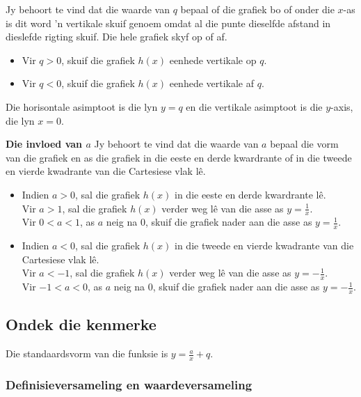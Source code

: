 Jy behoort te vind dat die waarde van $q$ bepaal of die grafiek bo of onder die $x$-as is dit word 'n vertikale skuif genoem omdat al die punte dieselfde afstand in dieslefde rigting skuif. Die hele grafiek skyf op of af.  
\begin{itemize}
\item Vir $q>0$, skuif die grafiek $h(x)$ eenhede vertikale op $q$. 
\item Vir $q<0$, skuif die grafiek $h(x)$ eenhede vertikale af $q$.
\end{itemize}
Die horisontale asimptoot is die lyn $y=q$ en die vertikale asimptoot is die $y$-axis, die lyn $x=0$.\par
\vspace{8pt}
\textbf{Die invloed van $a$}\newline
Jy behoort te vind dat die waarde van $a$ bepaal die vorm van die grafiek  en as die grafiek in die eeste en derde kwardrante of in die tweede
en vierde kwadrante van die Cartesiese vlak lê. 
\begin{itemize}
 \item Indien $a>0$, sal die grafiek $h(x)$ in die eeste en derde kwardrante lê. \\
Vir $a>1$, sal die grafiek $h(x)$ verder weg l\^e van die asse as $y=\frac{1}{x}$.
\\Vir $0<a<1$, as $a$ neig na $0$, skuif die grafiek nader aan die asse as $y=\frac{1}{x}$. 
\item Indien $a<0$, sal die grafiek $h(x)$ in die tweede
en vierde kwadrante van die Cartesiese vlak lê.\\
Vir $a<-1$, sal die grafiek $h(x)$ verder weg l\^e van die asse as $y=-\frac{1}{x}$.
\\Vir $-1<a<0$, as $a$ neig na $0$, skuif die grafiek nader aan die asse as $y=-\frac{1}{x}$. 
\end{itemize}



\subsection*{Ondek die kenmerke}  
Die standaardsvorm van die funksie is $y=\frac{a}{x}+q$.

\subsubsection*{Definisieversameling en waardeversameling}

